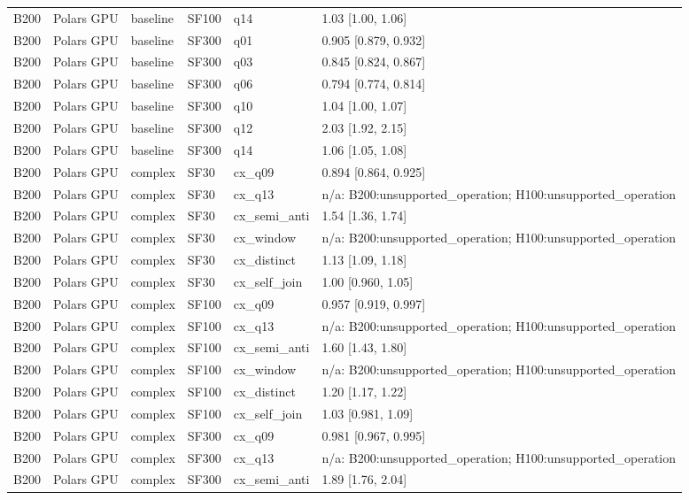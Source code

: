 \begin{longtable}{llllll}
B200 & Polars GPU & baseline & SF100 & q14 & 1.03 [1.00, 1.06] \\
B200 & Polars GPU & baseline & SF300 & q01 & 0.905 [0.879, 0.932] \\
B200 & Polars GPU & baseline & SF300 & q03 & 0.845 [0.824, 0.867] \\
B200 & Polars GPU & baseline & SF300 & q06 & 0.794 [0.774, 0.814] \\
B200 & Polars GPU & baseline & SF300 & q10 & 1.04 [1.00, 1.07] \\
B200 & Polars GPU & baseline & SF300 & q12 & 2.03 [1.92, 2.15] \\
B200 & Polars GPU & baseline & SF300 & q14 & 1.06 [1.05, 1.08] \\
B200 & Polars GPU & complex & SF30 & cx\_q09 & 0.894 [0.864, 0.925] \\
B200 & Polars GPU & complex & SF30 & cx\_q13 & n/a: B200:unsupported\_operation; H100:unsupported\_operation \\
B200 & Polars GPU & complex & SF30 & cx\_semi\_anti & 1.54 [1.36, 1.74] \\
B200 & Polars GPU & complex & SF30 & cx\_window & n/a: B200:unsupported\_operation; H100:unsupported\_operation \\
B200 & Polars GPU & complex & SF30 & cx\_distinct & 1.13 [1.09, 1.18] \\
B200 & Polars GPU & complex & SF30 & cx\_self\_join & 1.00 [0.960, 1.05] \\
B200 & Polars GPU & complex & SF100 & cx\_q09 & 0.957 [0.919, 0.997] \\
B200 & Polars GPU & complex & SF100 & cx\_q13 & n/a: B200:unsupported\_operation; H100:unsupported\_operation \\
B200 & Polars GPU & complex & SF100 & cx\_semi\_anti & 1.60 [1.43, 1.80] \\
B200 & Polars GPU & complex & SF100 & cx\_window & n/a: B200:unsupported\_operation; H100:unsupported\_operation \\
B200 & Polars GPU & complex & SF100 & cx\_distinct & 1.20 [1.17, 1.22] \\
B200 & Polars GPU & complex & SF100 & cx\_self\_join & 1.03 [0.981, 1.09] \\
B200 & Polars GPU & complex & SF300 & cx\_q09 & 0.981 [0.967, 0.995] \\
B200 & Polars GPU & complex & SF300 & cx\_q13 & n/a: B200:unsupported\_operation; H100:unsupported\_operation \\
B200 & Polars GPU & complex & SF300 & cx\_semi\_anti & 1.89 [1.76, 2.04] \\

\end{longtable}
